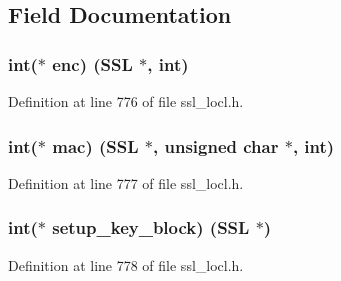 \subsection{Field Documentation}
\subsubsection[{\texorpdfstring{enc}{enc}}]{\setlength{\rightskip}{0pt plus 5cm}int($\ast$ enc) ({\bf S\+SL} $\ast$, int)}\hypertarget{structssl3__enc__method_a211260092271d3b9944de5ca37227cbe}{}\label{structssl3__enc__method_a211260092271d3b9944de5ca37227cbe}


Definition at line 776 of file ssl\+\_\+locl.\+h.

\subsubsection[{\texorpdfstring{mac}{mac}}]{\setlength{\rightskip}{0pt plus 5cm}int($\ast$ mac) ({\bf S\+SL} $\ast$, unsigned char $\ast$, int)}\hypertarget{structssl3__enc__method_aea78e60d168a44361a5b79aaa5fcd1ce}{}\label{structssl3__enc__method_aea78e60d168a44361a5b79aaa5fcd1ce}


Definition at line 777 of file ssl\+\_\+locl.\+h.

\subsubsection[{\texorpdfstring{setup\+\_\+key\+\_\+block}{setup_key_block}}]{\setlength{\rightskip}{0pt plus 5cm}int($\ast$ setup\+\_\+key\+\_\+block) ({\bf S\+SL} $\ast$)}\hypertarget{structssl3__enc__method_a7ce6b62bbedb7f02398ff688f930d802}{}\label{structssl3__enc__method_a7ce6b62bbedb7f02398ff688f930d802}


Definition at line 778 of file ssl\+\_\+locl.\+h.

